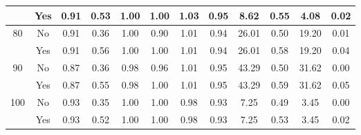 \begin{tabular}{cccccccccccc}
 & Yes & 0.91 & 0.53 & 1.00 & 1.00 & 1.03 & 0.95 & 8.62 & 0.55 & 4.08 & 0.02 \\
\midrule
\multirow{2}{*}{80} & No & 0.91 & 0.36 & 1.00 & 0.90 & 1.01 & 0.94 & 26.01 & 0.50 & 19.20 & 0.01 \\
 & Yes & 0.91 & 0.56 & 1.00 & 1.00 & 1.01 & 0.94 & 26.01 & 0.58 & 19.20 & 0.04 \\
\midrule
\multirow{2}{*}{90} & No & 0.87 & 0.36 & 0.98 & 0.96 & 1.01 & 0.95 & 43.29 & 0.50 & 31.62 & 0.00 \\
 & Yes & 0.87 & 0.55 & 0.98 & 1.00 & 1.01 & 0.95 & 43.29 & 0.59 & 31.62 & 0.05 \\
\midrule
\multirow{2}{*}{100} & No & 0.93 & 0.35 & 1.00 & 1.00 & 0.98 & 0.93 & 7.25 & 0.49 & 3.45 & 0.00 \\
 & Yes & 0.93 & 0.52 & 1.00 & 1.00 & 0.98 & 0.93 & 7.25 & 0.53 & 3.45 & 0.02 \\
\bottomrule
\end{tabular}
